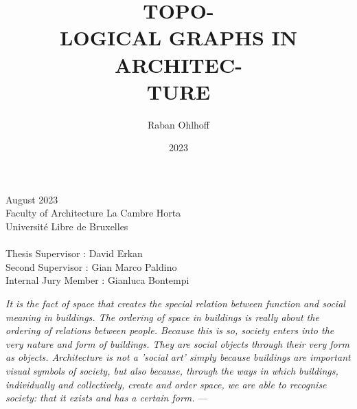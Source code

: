 \documentclass[a4paper, 12pt]{report}
\title{\fontsize{65}{60}\selectfont TOPO-\\LOGICAL GRAPHS IN ARCHITEC-\\TURE\vspace{-25pt}}
\author{\fontsize{28}{13}\selectfont Raban Ohlhoff}
\date{\vspace{-15pt}2023}
\begin{document}


\maketitle
\clearpage
\vspace*{\fill}
August 2023\\
Faculty of Architecture La Cambre Horta\\
Université Libre de Bruxelles\\\\
Thesis Supervisor : David Erkan\\
Second Supervisor : Gian Marco Paldino\\
Internal Jury Member : Gianluca Bontempi
\clearpage

\tableofcontents

\clearpage
\vspace*{\fill}
\textit{It is the fact of space that creates the special relation between function and social meaning in buildings. The ordering of space in buildings is really about the ordering of relations between people. Because this is so, society enters into the very nature and form of buildings. They are social objects through their very form as objects. Architecture is not a 'social art' simply because buildings are important visual symbols of society, but also because, through the ways in which buildings, individually and collectively, create and order space, we are able to recognise society: that it exists and has a certain form.} --- \cite{hillier1989social}
\vspace*{\fill}
\clearpage
\end{document}
